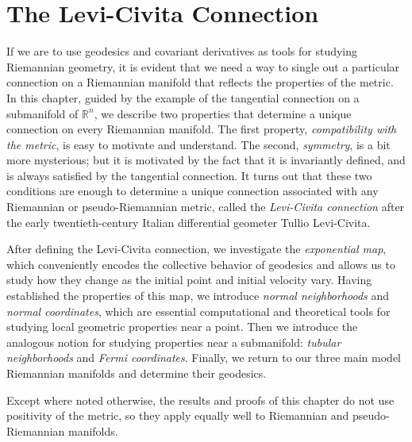 
\section{The Levi-Civita Connection}

If we are to use geodesics and covariant derivatives as tools for studying Riemannian geometry, it is evident that we need a way to single out a particular connection on a Riemannian manifold that reflects the properties of the metric. In this chapter, guided by the example of the tangential connection on a submanifold of $\mathbb{R}^n$, we describe two properties that determine a unique connection on every Riemannian manifold. The first property, \emph{compatibility with the metric}, is easy to motivate and understand. The second, \emph{symmetry}, is a bit more mysterious; but it is motivated by the fact that it is invariantly defined, and is always satisfied by the tangential connection. It turns out that these two conditions are enough to determine a unique connection associated with any Riemannian or pseudo-Riemannian metric, called the \emph{Levi-Civita connection} after the early twentieth-century Italian differential geometer Tullio Levi-Civita.

After defining the Levi-Civita connection, we investigate the \emph{exponential map}, which conveniently encodes the collective behavior of geodesics and allows us to study how they change as the initial point and initial velocity vary. Having established the properties of this map, we introduce \emph{normal neighborhoods} and \emph{normal coordinates}, which are essential computational and theoretical tools for studying local geometric properties near a point. Then we introduce the analogous notion for studying properties near a submanifold: \emph{tubular neighborhoods} and \emph{Fermi coordinates}. Finally, we return to our three main model Riemannian manifolds and determine their geodesics.

Except where noted otherwise, the results and proofs of this chapter do not use positivity of the metric, so they apply equally well to Riemannian and pseudo-Riemannian manifolds.

